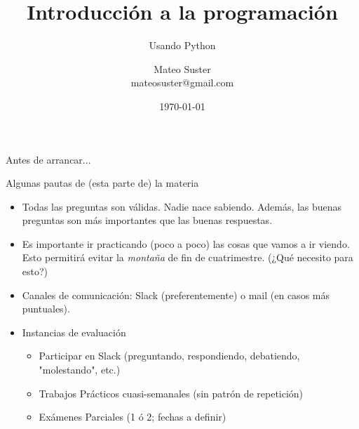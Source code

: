 \documentclass{beamer}
\title[Intro Prog] %
{Introducción a la programación}
\subtitle
{Usando Python}
\author[MS]
{Mateo Suster \\ mateosuster@gmail.com}%
\institute[UNGS] %
{
  Matemática para Economistas III \\ 
  Instituto de Industria\\
  Universidad Nacional de General Sarmiento
}
\date[] %
{ \today}
\begin{document}
\begin{frame}
  \titlepage
\end{frame}


\begin{frame}{Antes de arrancar...}
  \begin{block}{Algunas pautas de (esta parte de) la materia}
  \end{block}\pause
  \begin{itemize}
  	\item Todas las preguntas son válidas. \pause 
  	Nadie nace sabiendo. \pause Además, las buenas preguntas son más importantes que las buenas respuestas. \pause
	\item Es importante ir practicando (poco a poco) las cosas que vamos a ir viendo. \pause Esto permitirá evitar la \emph{montaña} de fin de cuatrimestre. \pause (¿Qué necesito para esto?) \pause
	\item Canales de comunicación: \pause Slack (preferentemente) o mail (en casos más puntuales). \pause
	\item Instancias de evaluación \pause
		\begin{itemize}
			\item Participar en Slack (preguntando, respondiendo, debatiendo, "molestando", etc.) \pause
			\item Trabajos Prácticos cuasi-semanales (sin patrón de repetición)\pause
			\item Exámenes Parciales (1 ó 2; fechas a definir)
		\end{itemize}	
  \end{itemize}
\end{frame}
\end{document}
